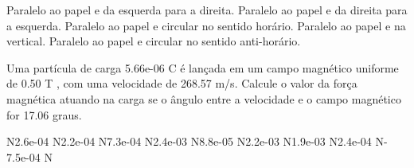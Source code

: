 \documentclass[12pt, addpoints]{exam}
\begin{document}
\begin{questions}
\begin{multicols*}{2}
\begin{choices}
\choice Paralelo ao papel e da esquerda para a direita. 
\choice Paralelo ao papel e da direita para a esquerda. 
\choice Paralelo ao papel e circular no sentido horário. 
\choice Paralelo ao papel e na vertical. 
\choice Paralelo ao papel e circular no sentido anti-horário. 
\end{choices}
\question Uma partícula de carga 5.66e-06 C é lançada em um campo magnético uniforme de    0.50 T , com uma velocidade de 268.57 m/s. Calcule o valor da força magnética atuando na carga se o ângulo entre a velocidade e o campo magnético for   17.06 graus.

\begin{oneparchoices}
 N\choice 2.6e-04 N\choice 2.2e-04 N\choice 7.3e-04 N\choice 2.4e-03 N\choice 8.8e-05 N\choice 2.2e-03 N\choice 1.9e-03 N\choice 2.4e-04 N\choice -7.5e-04 N
\end{oneparchoices}\end{multicols*}
\end{questions}
\newpage
\end{document}

